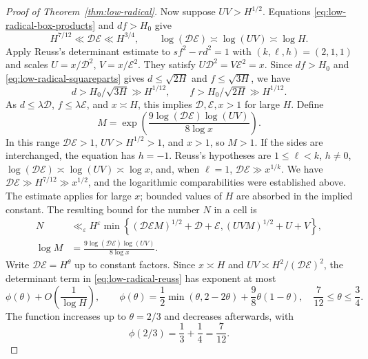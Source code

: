 \begin{proof}[Proof of Theorem~\ref{thm:low-radical}]
Now suppose $UV>H^{1/2}$. Equations
\eqref{eq:low-radical-box-products} and $df>H_0$ give
\[
H^{7/12}\ll \mathcal D\mathcal E\ll H^{3/4},\qquad
\log(\mathcal D\mathcal E)\asymp\log(UV)\asymp\log H.
\]
Apply Reuss's determinant estimate \cite[Theorem~1]{Reuss2014} to
$sf^2-rd^2=1$ with $(k,\ell,h)=(2,1,1)$ and scales
$U=x/\mathcal D^2$, $V=x/\mathcal E^2$. They satisfy
$U\mathcal D^2=V\mathcal E^2=x$. Since $df>H_0$ and
\eqref{eq:low-radical-squareparts} gives $d\le\sqrt{2H}$ and
$f\le\sqrt{3H}$, we have
\[
d>H_0/\sqrt{3H}\gg H^{1/12},\qquad
f>H_0/\sqrt{2H}\gg H^{1/12}.
\]
As $d\le\lambda \mathcal D$, $f\le\lambda \mathcal E$, and $x\asymp H$, this implies
$\mathcal D,\mathcal E,x>1$ for large $H$. Define
\[
M=\exp\!\left(\frac{9\log(\mathcal D\mathcal E)\log(UV)}{8\log x}\right).
\]
In this range $\mathcal D\mathcal E>1$, $UV>H^{1/2}>1$, and $x>1$, so $M>1$.
If the sides are interchanged, the equation has $h=-1$. Reuss's
hypotheses are $1\le\ell<k$, $h\ne0$,
$\log(\mathcal D\mathcal E)\asymp\log(UV)\asymp\log x$, and, when $\ell=1$,
$\mathcal D\mathcal E\gg x^{1/k}$. We have $\mathcal D\mathcal E\gg H^{7/12}\gg x^{1/2}$, and the logarithmic
comparabilities were established above. The estimate applies for large
$x$; bounded values of $H$ are absorbed in the implied constant. The
resulting bound for the number $N$ in a cell is
\begin{equation}\label{eq:low-radical-reuss}
\begin{aligned}
N&\ll_\varepsilon H^\varepsilon
 \min\left\{(\mathcal D\mathcal E M)^{1/2}+\mathcal D+\mathcal E,
              (UV M)^{1/2}+U+V\right\},\\
\log M&=\frac{9\log(\mathcal D\mathcal E)\log(UV)}{8\log x}.
\end{aligned}
\end{equation}
Write $\mathcal D\mathcal E=H^\theta$ up to constant factors. Since $x\asymp H$ and
$UV\asymp H^2/(\mathcal D\mathcal E)^2$, the determinant term in
\eqref{eq:low-radical-reuss} has exponent at most
\[
\phi(\theta)+O\left(\frac1{\log H}\right),\qquad
\phi(\theta)=\frac12\min(\theta,2-2\theta)+\frac98\theta(1-\theta),
\quad \frac7{12}\le\theta\le\frac34.
\]
The function increases up to $\theta=2/3$ and decreases afterwards, with
\[
\phi(2/3)=\frac13+\frac14=\frac7{12}.
\]


\end{proof}
